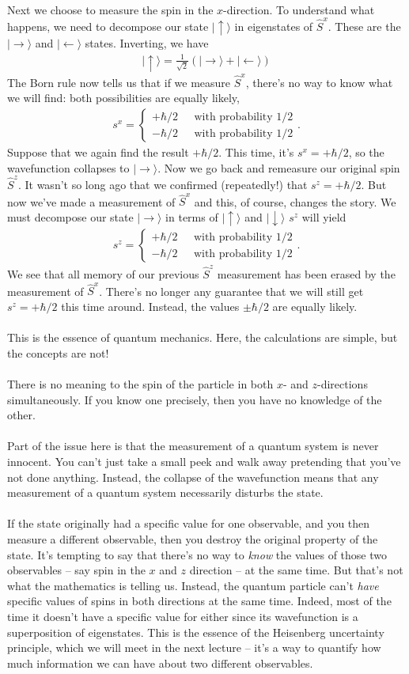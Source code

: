 \documentclass[12pt]{article}
\def\be{\begin{eqnarray}}
\def\ee{\end{eqnarray}}
\newcommand{\nn}{\nonumber}
\newcommand\para{\paragraph{}}
\newcommand{\upket}{|\uparrow\rangle}
\newcommand{\downket}{|\downarrow\rangle}
\newcommand{\rightket}{|\rightarrow\rangle}
\newcommand{\leftket}{|\leftarrow\rangle}
\begin{document}
{{\para
Next we choose to measure the spin in the $x$-direction. To understand what happens, we need to decompose our state $\upket$ in eigenstates of $\hat{S}^x$. These are the $\rightket$ and $\leftket$ states.  Inverting, we have
%
\be \upket = \frac{1}{\sqrt{2}}(\rightket + \leftket)\nn\ee
%
The Born rule now tells us that if we measure $\hat{S}^x$, there's no way to know what we will find: both possibilities are equally likely,
%
%
\be s^x = \left\{\begin{array}{cc} +{\hbar}/{2}\ \ \ &\mbox{with probability 1/2}  \\ -{\hbar}/{2}\ \ \ &\mbox{with probability 1/2}\end{array}\right..\nn\ee
%
Suppose that we again find the result $+\hbar/2$. This time, it's $s^x=+\hbar/2$, so the wavefunction collapses to $\rightket$. Now we go back and remeasure our original spin $\hat{S}^z$. It wasn't so long ago that we confirmed (repeatedly!) that $s^z=+\hbar/2$. But now we've made a measurement of $\hat{S}^x$ and this, of course, changes the story. We must decompose our state $\rightket$  in terms of $\upket$ and $\downket$ $s^z$ will yield
%
%
\be s^z = \left\{\begin{array}{cc} +{\hbar}/{2}\ \ \ &\mbox{with probability 1/2}  \\ -{\hbar}/{2}\ \ \ &\mbox{with probability 1/2}\end{array}\right..\ee
%
We see that all memory of our previous $\hat{S}^z$ measurement has been erased by the measurement of $\hat{S}^x$. There's no longer any guarantee that we will still get $s^z=+\hbar/2$ this time around. Instead, the values $\pm \hbar/2$ are equally likely. }


\para
This is the essence of quantum mechanics. Here, the calculations are simple, but the concepts are not! 

\para
There is no meaning to the spin of the particle in both $x$- and $z$-directions simultaneously. If you know one precisely, then you have no knowledge of the other. 


\para
Part of the issue here is that the measurement of a quantum system is never innocent. You can't just take a small peek and walk away pretending that you've not done anything. Instead, the collapse of the wavefunction means that any measurement of  a quantum system necessarily disturbs the state. 

\para
If the state originally had a specific value for one observable,  and you then measure a different observable,  then you destroy the original property of the state. It's tempting to say that there's no way to {\it know} the values of those two observables -- say spin in the $x$ and $z$ direction -- at the same time. But that's not what the mathematics is telling us. Instead, the quantum particle can't  {\it have} specific values of spins in both directions at the same time. Indeed, most  of the time it doesn't have a specific value for either since its wavefunction is a superposition of eigenstates. This is the essence of the Heisenberg uncertainty principle, which we will meet in the next lecture -- it's a way to quantify how much information we can have about two different observables. 



}
\end{document}
